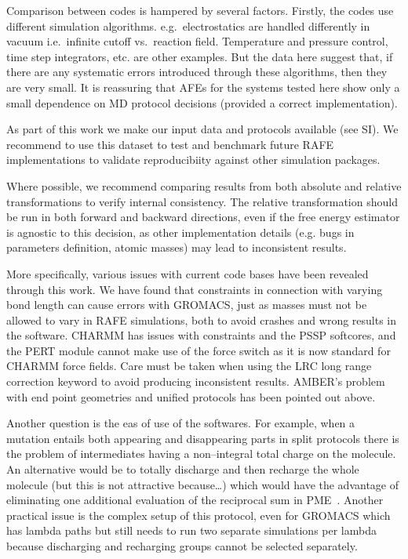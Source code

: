 \documentclass[journal=jctcce,manuscript=article]{achemso}
\begin{document}
Comparison between codes is hampered by several factors.  Firstly, the codes use different simulation algorithms.  e.g.\ 
electrostatics are handled differently in vacuum i.e.\ infinite cutoff vs.\ 
reaction field.  Temperature and pressure control, time step integrators, etc. 
are other examples.  But the data here suggest that, if there are any 
systematic errors introduced through these algorithms, then they are very small.  It is reassuring that AFEs for the systems tested here show only a small dependence on MD protocol decisions (provided a correct implementation).

As part of this work we make our input data and protocols available (see SI).  We recommend to use this dataset to test and benchmark future RAFE implementations to validate reproducibiity against other simulation packages.

Where possible, we recommend comparing results from both absolute and relative transformations to verify internal consistency.
The relative transformation should be run in both forward and backward directions, even if the free energy estimator is agnostic to this decision, as other implementation details (e.g. bugs in parameters definition, atomic masses) may lead to inconsistent results.  

More specifically, various issues with current code bases have been revealed through this work.  
We have found that constraints in connection with varying bond length can cause errors with GROMACS, just as masses must not be allowed to vary in RAFE 
simulations, both to avoid crashes and wrong results in the 
software.  CHARMM has issues with constraints and the PSSP softcores, and the PERT module cannot make use of the force switch as it is now standard for CHARMM force fields. Care must be taken when using the LRC long range correction keyword to avoid producing inconsistent results.  AMBER's problem with end point geometries and unified protocols has been pointed out above.

Another question is the eas of use of the softwares.  For example, 
when a mutation entails both appearing and disappearing parts in split 
protocols there is the problem of intermediates having a non--integral total 
charge on the molecule.  An alternative would be to totally discharge and then 
recharge the whole molecule (but this is not attractive because\ldots) which 
would have the advantage of eliminating one additional evaluation of the 
reciprocal sum in PME~\cite{doi:10.1021/ct400340s}.  Another practical issue is 
the complex setup of this protocol, even for GROMACS which has lambda paths but 
still needs to run two separate simulations per lambda because discharging and 
recharging groups cannot be selected separately.
\end{document}
